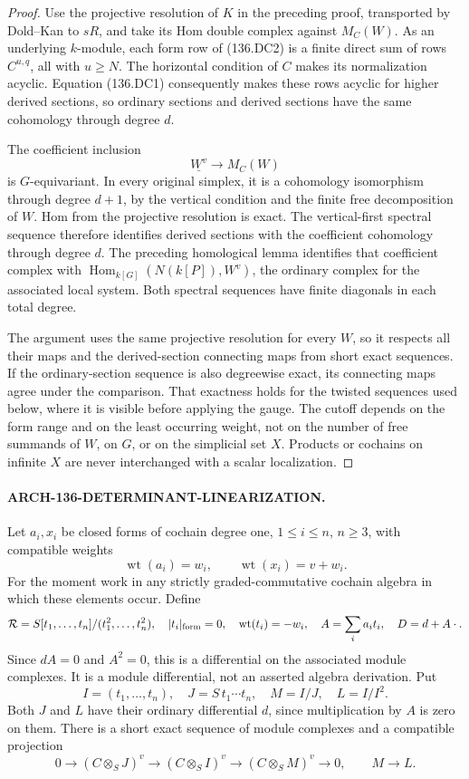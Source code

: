 \begin{proof}
Use the projective resolution of \(K\) in the preceding proof,
transported by Dold--Kan to \(sR\), and take its Hom double complex
against \(M_C(W)\).
As an underlying \(k\)-module, each form row of (136.DC2) is a finite
direct sum of rows \(C^{u,q}\), all with \(u\geq N\).
The horizontal condition of \(C\) makes its normalization acyclic.
Equation (136.DC1) consequently makes these rows acyclic for higher
derived sections, so ordinary sections and derived sections have the
same cohomology through degree \(d\).

The coefficient inclusion
\[
                 \underline{W^v}\longrightarrow M_C(W)
\]
is \(G\)-equivariant. In every original simplex, it is a cohomology
isomorphism through degree \(d+1\), by the vertical condition and the
finite free decomposition of \(W\). Hom from the projective resolution
is exact. The vertical-first spectral sequence therefore identifies
derived sections with the coefficient cohomology through degree \(d\).
The preceding homological lemma identifies that coefficient complex
with \(\operatorname{Hom}_{k[G]}(N(k[P]),W^v)\), the ordinary complex
for the associated local system. Both spectral sequences have finite
diagonals in each total degree.

The argument uses the same projective resolution for every \(W\), so
it respects all their maps and the derived-section connecting maps
from short exact sequences. If the ordinary-section sequence is also
degreewise exact, its connecting maps agree under the comparison.
That exactness holds for the twisted sequences used below, where it
is visible before applying the gauge. The cutoff depends on the form range and on the least
occurring weight, not on the number of free summands of \(W\), on \(G\),
or on the simplicial set \(X\). Products or cochains on infinite \(X\)
are never interchanged with a scalar localization.
\end{proof}

\paragraph{ARCH-136-DETERMINANT-LINEARIZATION.}
Let \(a_i,x_i\) be closed forms of cochain degree one, \(1\leq i\leq n\),
\(n\geq3\), with compatible weights
\[
 \operatorname{wt}(a_i)=w_i,\qquad
 \operatorname{wt}(x_i)=v+w_i.                       \tag{136.DC4}
\]
For the moment work in any strictly graded-commutative cochain algebra
in which these elements occur. Define
\[
 \mathcal R=S[t_1,\ldots,t_n]/(t_1^2,\ldots,t_n^2),\quad
 |t_i|_{\rm form}=0,\quad \operatorname{wt}(t_i)=-w_i,
 \quad A=\sum_i a_it_i,\quad D=d+A\cdot .
\]
Since \(dA=0\) and \(A^2=0\), this is a differential on the associated
module complexes. It is a module differential, not an asserted algebra
derivation. Put
\[
 I=(t_1,\ldots,t_n),\quad
 J=S\,t_1\cdots t_n,\quad M=I/J,\quad L=I/I^2 .
\]
Both \(J\) and \(L\) have their ordinary differential \(d\), since
multiplication by \(A\) is zero on them. There is a short exact sequence
of module complexes and a compatible projection
\[
 0\longrightarrow(C\otimes_SJ)^v
 \longrightarrow(C\otimes_SI)^v
 \longrightarrow(C\otimes_SM)^v\longrightarrow0,
 \qquad M\longrightarrow L .                        \tag{136.DC5}
\]

